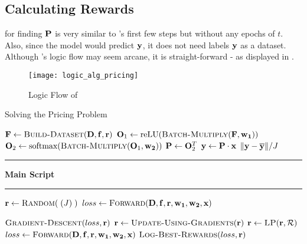 \subsection{Calculating Rewards} \label{sec:Calculating Rewards}
 for finding $\mathbf{P}$ is very similar to 's first few steps but without any epochs of $t$. Also, since the model would predict $\mathbf{y}$, it does not need labels $\mathbf{y}$ as a dataset. Although 's logic flow may seem arcane, it is straight-forward - as displayed in .
\begin{figure}[!htbp]
    \centering
    \texttt{[image: logic\_alg\_pricing]}
    \caption{Logic Flow of }
    \label{fig:Logic Flow of Algorithm Pricing Problem}
\end{figure}
\begin{algorithm}
    \caption{Solving the Pricing Problem} \label{alg:Solving the Pricing Problem}
    \begin{algorithmic}[1]
            \State $\matr{F} \gets \Call{Build-Dataset}{\matr{D}, \matr{f}, \vect{r}}$
            \State $\matr{O}_1 \gets \text{reLU}(\Call{Batch-Multiply}{\matr{F}, \matr{w_1}})$
            \State $\matr{O}_2 \gets \text{softmax}(\Call{Batch-Multiply}{\matr{O}_1, \matr{w_2}})$
            \State $\mathbf{P} \gets \mathbf{O}_2^T$
            \State $\mathbf{y} \gets \mathbf{P} \cdot \mathbf{x}$
            \State \Return $\lVert \mathbf{y} - \overline{\mathbf{y}} \rVert / J$
        \EndFunction
        \vspace*{-.7\baselineskip}\Statex\hspace*{\dimexpr-\algorithmicindent-2pt\relax}\rule{\textwidth}{0.1pt}%
        \Statex\hspace*{-\algorithmicindent}\textbf{Main Script}%
        \vspace*{-.6\baselineskip}\Statex\hspace*{\dimexpr-\algorithmicindent-2pt\relax}\rule{\textwidth}{0.1pt}%
        \State $\vect{r} \gets \Call{Random}{\;(J)\;}$
        \State $loss \gets \Call{Forward}{\matr{D}, \matr{f}, \vect{r}, \matr{w_1}, \matr{w_2}, \vect{x}}$
            
        \State $\Call{Gradient-Descent}{loss, \vect{r}}$
        \State $\vect{r} \gets \Call{Update-Using-Gradients}{\vect{r}}$
        \State $\vect{r} \gets \Call{LP}{\vect{r}, \mathcal{R}}$
        \State $loss \gets \Call{Forward}{\matr{D}, \matr{f}, \vect{r}, \matr{w_1}, \matr{w_2}, \vect{x}}$
        \State $\Call{Log-Best-Rewards}{loss, \vect{r}}$
        \EndFor
    \end{algorithmic}
\end{algorithm}

